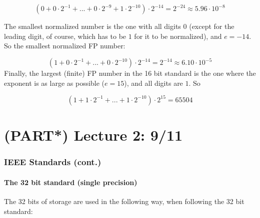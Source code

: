 \documentclass[]{book}
\theoremstyle{definition}
\theoremstyle{definition}
\theoremstyle{definition}
\theoremstyle{remark}
\begin{document}
\[
\left(0 + 0\cdot 2^{-1} + ... + 0\cdot 2^{-9} + 1\cdot 2^{-10}\right)\cdot 2^{-14} = 2^{-24} \approx 5.96\cdot 10^{-8}
\]

The smallest normalized number is the one with all digits \(0\) (except
for the leading digit, of course, which has to be \(1\) for it to be
normalized), and \(e = -14\). So the smallest normalized FP number:

\[
\left(1 + 0\cdot 2^{-1} + ... + 0\cdot 2^{-10}\right)\cdot 2^{-14} = 2^{-14} \approx 6.10\cdot 10^{-5}
\] Finally, the largest (finite) FP number in the 16 bit standard is the
one where the exponent is as large as possible (\(e = 15\)), and all
digits are \(1\). So

\[
\left(1 + 1\cdot 2^{-1} + ... + 1\cdot 2^{-10}\right)\cdot 2^{15} = 65504
\]

\chapter{(PART*) Lecture 2: 9/11}\label{part-lecture-2-911}

\subsection{IEEE Standards (cont.)}\label{ieee-standards-cont.}

\subsubsection{The 32 bit standard (single
precision)}\label{the-32-bit-standard-single-precision}

The 32 bits of storage are used in the following way, when following the
32 bit standard:
\end{document}
